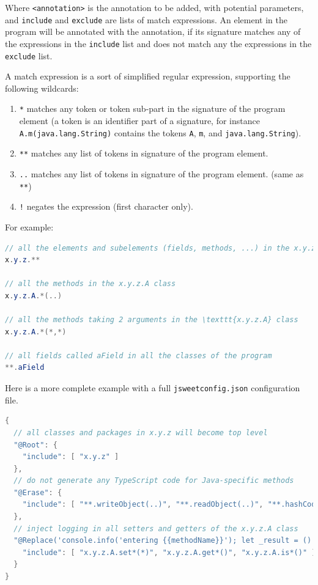 \documentclass[a4paper]{report}
\begin{document}
Where \texttt{<annotation>} is the annotation to be added, with potential parameters, and \texttt{include} and \texttt{exclude} are lists of match expressions. An element in the program will be annotated with the annotation, if its signature matches any of the expressions in the \texttt{include} list and does not match any the expressions in the \texttt{exclude} list.

A match expression is a sort of simplified regular expression, supporting the following wildcards:

\begin{enumerate}
\item \texttt{*} matches any token or token sub-part in the signature of the program element (a token is an identifier part of a signature, for instance \texttt{A.m(java.lang.String)} contains the tokens \texttt{A}, \texttt{m}, and \texttt{java.lang.String}).
\item \texttt{**} matches any list of tokens in signature of the program element.
\item \texttt{..} matches any list of tokens in signature of the program element. (same as \texttt{**})
\item \texttt{!} negates the expression (first character only).
\end{enumerate}

\noindent
For example:

\begin{lstlisting}[language=Java]
// all the elements and subelements (fields, methods, ...) in the x.y.z package
x.y.z.**

// all the methods in the x.y.z.A class
x.y.z.A.*(..)

// all the methods taking 2 arguments in the \texttt{x.y.z.A} class
x.y.z.A.*(*,*)

// all fields called aField in all the classes of the program
**.aField
\end{lstlisting}

\noindent
Here is a more complete example with a full \texttt{jsweetconfig.json} configuration file.

\begin{lstlisting}[language=Java]
{
  // all classes and packages in x.y.z will become top level
  "@Root": {
    "include": [ "x.y.z" ]
  },
  // do not generate any TypeScript code for Java-specific methods
  "@Erase": {
    "include": [ "**.writeObject(..)", "**.readObject(..)", "**.hashCode(..)" ]
  },
  // inject logging in all setters and getters of the x.y.z.A class
  "@Replace('console.info('entering {{methodName}}'); let _result = () => { {{body}} }(); console.info('returning '+_result); return _result;')": {
    "include": [ "x.y.z.A.set*(*)", "x.y.z.A.get*()", "x.y.z.A.is*()" ]
  }
}
\end{lstlisting}
\end{document}
